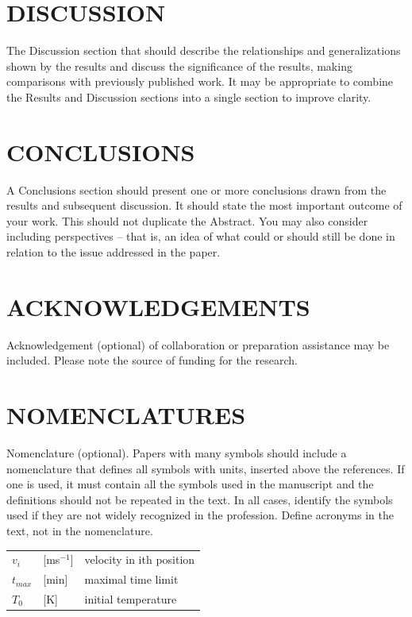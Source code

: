 \documentclass[10pt]{JoME}
\begin{document}
\section{DISCUSSION}

The Discussion section that should describe the relationships and generalizations shown by the results and discuss the significance of the results, making comparisons with previously published work. It may be appropriate to combine the Results and Discussion sections into a single section to improve clarity.

\section{CONCLUSIONS}

A Conclusions section should present one or more conclusions drawn from the results and subsequent discussion. It should state the most important outcome of your work. This should not duplicate the Abstract. You may also consider including perspectives -- that is, an idea of what could or should still be done in relation to the issue addressed in the paper.

\section{ACKNOWLEDGEMENTS}

Acknowledgement (optional) of collaboration or preparation assistance may be included. Please note the source of funding for the research.

\section{NOMENCLATURES}

Nomenclature (optional). Papers with many symbols should include a nomenclature that defines all symbols with units, inserted above the references. If one is used, it must contain all the symbols used in the manuscript and the definitions should not be repeated in the text. In all cases, identify the symbols used if they are not widely recognized in the profession. Define acronyms in the text, not in the nomenclature.\smallskip\\ 
\begin{tabular}{lll}
$v_i$	& [ms$^{-1}$] & velocity in ith position\\
$t_{max}$	& [min]  & maximal time limit\\
$T_0$	& [K]	& initial temperature
\end{tabular}
\end{document}

